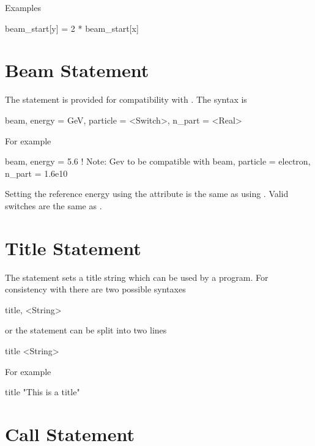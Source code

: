 \noindent
Examples
\begin{example}
  beam_start[y] = 2 * beam_start[x]
\end{example}

\section{Beam Statement}

The  statement is provided for compatibility with \mad. The syntax is
\begin{example}
  beam, energy = GeV, particle = <Switch>, n_part = <Real>
\end{example}
For example
\begin{example}
  beam, energy = 5.6  ! Note: Gev to be compatible with \mad
  beam, particle = electron, n_part = 1.6e10
\end{example}
Setting the reference energy using the  attribute is the same
as using . Valid 
switches are the same as .

\section{Title Statement}

The  statement sets a title string which can be used by a program. 
For consistency with \mad there are two possible syntaxes
\begin{example}
  title, <String>
\end{example}
or the statement can be split into two lines
\begin{example}
  title
  <String>
\end{example}
For example
\begin{example}
  title
  "This is a title"
\end{example}

\section{Call Statement}

